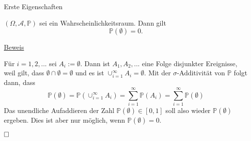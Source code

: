 \documentclass[
  8pt,
  ignorenonframetext,
]{beamer}
\begin{document}
\begin{frame}{Erste Eigenschaften}
\protect\hypertarget{erste-eigenschaften}{}
\small
\begin{theorem}
\justifying
\normalfont
$(\Omega, \mathcal{A}, \mathbb{P})$ sei ein Wahrscheinlichkeitsraum. Dann gilt
\begin{equation}
\mathbb{P}(\emptyset) = 0.
\end{equation}
\end{theorem}

\footnotesize

\underline{Beweis}

Für \(i = 1,2,...\) sei \(A_i := \emptyset\). Dann ist \(A_1,A_2,...\)
eine Folge disjunkter Ereignisse, weil gilt, dass
\(\emptyset \cap \emptyset = \emptyset\) und es ist
\(\cup_{i=1}^\infty A_i = \emptyset\). Mit der \(\sigma\)-Additivität
von \(\mathbb{P}\) folgt dann, dass \begin{equation}
\mathbb{P}(\emptyset)
= \mathbb{P}\left(\cup_{i=1}^\infty A_i\right)
= \sum_{i=1}^\infty \mathbb{P}\left(A_i\right)
= \sum_{i=1}^\infty \mathbb{P}\left(\emptyset\right)
\end{equation} Das unendliche Aufaddieren der Zahl
\(\mathbb{P}(\emptyset) \in [0,1]\) soll also wieder
\(\mathbb{P}(\emptyset)\) ergeben. Dies ist aber nur möglich, wenn
\(\mathbb{P}(\emptyset) = 0\).

\(\hfill\Box\)
\end{frame}
\end{document}
